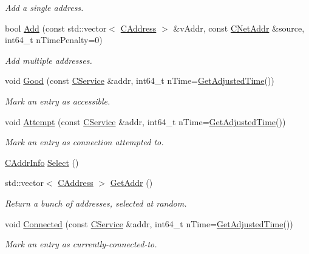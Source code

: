\begin{DoxyCompactItemize}
\begin{DoxyCompactList}\small\item\em Add a single address. \end{DoxyCompactList}\item 
bool \hyperlink{class_c_addr_man_aa2ae2abdf710b2d81fa37f072bab028e}{Add} (const std\+::vector$<$ \hyperlink{class_c_address}{C\+Address} $>$ \&v\+Addr, const \hyperlink{class_c_net_addr}{C\+Net\+Addr} \&source, int64\+\_\+t n\+Time\+Penalty=0)
\begin{DoxyCompactList}\small\item\em Add multiple addresses. \end{DoxyCompactList}\item 
void \hyperlink{class_c_addr_man_a993e80e74701d7bc6bb49880c387b847}{Good} (const \hyperlink{class_c_service}{C\+Service} \&addr, int64\+\_\+t n\+Time=\hyperlink{timedata_8h_a09f81b9c7650f898cf3cf305b87547e6}{Get\+Adjusted\+Time}())
\begin{DoxyCompactList}\small\item\em Mark an entry as accessible. \end{DoxyCompactList}\item 
void \hyperlink{class_c_addr_man_afcddc2573121065177dc981cea710789}{Attempt} (const \hyperlink{class_c_service}{C\+Service} \&addr, int64\+\_\+t n\+Time=\hyperlink{timedata_8h_a09f81b9c7650f898cf3cf305b87547e6}{Get\+Adjusted\+Time}())
\begin{DoxyCompactList}\small\item\em Mark an entry as connection attempted to. \end{DoxyCompactList}\item 
\hyperlink{class_c_addr_info}{C\+Addr\+Info} \hyperlink{class_c_addr_man_a40033486ee621d5f858748e5454222e2}{Select} ()
\item 
std\+::vector$<$ \hyperlink{class_c_address}{C\+Address} $>$ \hyperlink{class_c_addr_man_a69cc6138e696cf88de60925d26023bf2}{Get\+Addr} ()
\begin{DoxyCompactList}\small\item\em Return a bunch of addresses, selected at random. \end{DoxyCompactList}\item 
void \hyperlink{class_c_addr_man_a7aba66d9e9527522fed974567d34c322}{Connected} (const \hyperlink{class_c_service}{C\+Service} \&addr, int64\+\_\+t n\+Time=\hyperlink{timedata_8h_a09f81b9c7650f898cf3cf305b87547e6}{Get\+Adjusted\+Time}())
\begin{DoxyCompactList}\small\item\em Mark an entry as currently-\/connected-\/to. \end{DoxyCompactList}\end{DoxyCompactItemize}
